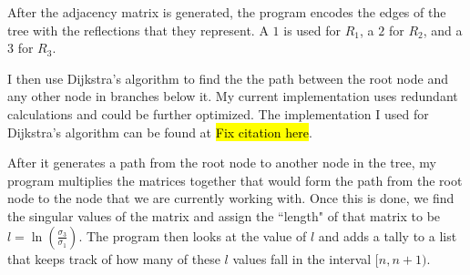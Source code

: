 \documentclass{amsart}
\begin{document}
After the adjacency matrix is generated, the program encodes the edges of the tree with the reflections that they represent. A $1$ is used for $R_1$, a $2$ for $R_2$, and a $3$ for $R_3$. 



I then use Dijkstra's algorithm to find the the path between the root node and any other node in branches below it. My current implementation uses redundant calculations and could be further optimized. The implementation I used for Dijkstra's algorithm can be found at \hl{Fix citation here}\cite{alexey_dijkstra_alg}.


 After it generates a path from the root node to another node in the tree, my program multiplies the matrices together that would form the path from the root node to the node that we are currently working with. Once this is done, we find the singular values of the matrix and assign the ``length" of that matrix to be $l = \ln\left(\frac{\sigma_3}{\sigma_1}\right)$. The program then looks at the value of $l$ and adds a tally to a list that keeps track of how many of these $l$ values fall in the interval $[n, n+1)$.
 
 

\newpage
\printbibliography
\end{document}
